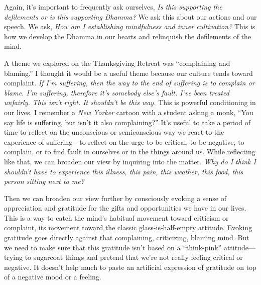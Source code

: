 Again, it's important to frequently ask ourselves, \emph{Is this 
supporting the defilements or is this supporting Dhamma?} We ask this 
about our actions and our speech. We ask, \emph{How am I establishing 
mindfulness and inner cultivation?} This is how we develop the Dhamma 
in our hearts and relinquish the defilements of the mind.


A theme we explored on the Thanksgiving Retreat was ``complaining and 
blaming.'' I thought it would be a useful theme because our culture 
tends toward complaint. \emph{If I'm suffering, then the way to the end 
of suffering is to complain or blame. I'm suffering, therefore it's 
somebody else's fault. I've been treated unfairly. This isn't right. It 
shouldn't be this way.} This is powerful conditioning in our lives. I 
remember a \emph{New Yorker} cartoon with a student asking a monk, 
``You say life is suffering, but isn't it also complaining?'' It's 
useful to take a period of time to reflect on the unconscious or 
semiconscious way we react to the experience of suffering---to reflect 
on the urge to be critical, to be negative, to complain, or to find 
fault in ourselves or in the things around us. While reflecting like 
that, we can broaden our view by inquiring into the matter. \emph{Why 
do I think I shouldn't have to experience this illness, this pain, this 
weather, this food, this person sitting next to me?}

Then we can broaden our view further by consciously evoking a sense of 
appreciation and gratitude for the gifts and opportunities we have in 
our lives. This is a way to catch the mind's habitual movement toward 
criticism or complaint, its movement toward the classic 
glass-is-half-empty attitude. Evoking gratitude goes directly against 
that complaining, criticizing, blaming mind. But we need to make sure 
that this gratitude isn't based on a ``think-pink'' attitude---trying 
to sugarcoat things and pretend that we're not really feeling critical 
or negative. It doesn't help much to paste an artificial expression of 
gratitude on top of a negative mood or a feeling.

